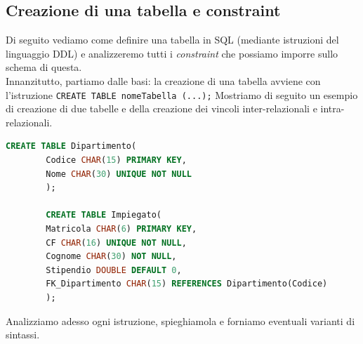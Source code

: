 \documentclass[12pt]{report}
\begin{document}
	\subsection{Creazione di una tabella e constraint}
	Di seguito vediamo come definire una tabella in SQL (mediante istruzioni del linguaggio DDL) e analizzeremo tutti i \textit{constraint} che possiamo imporre sullo schema di questa.\\
	Innanzitutto, partiamo dalle basi: la creazione di una tabella avviene con l'istruzione \texttt{CREATE TABLE nomeTabella (...);}
	Mostriamo di seguito un esempio di creazione di due tabelle e della creazione dei vincoli inter-relazionali e intra-relazionali.
	\begin{lstlisting}[language=SQL]
		CREATE TABLE Dipartimento(
		Codice CHAR(15) PRIMARY KEY,
		Nome CHAR(30) UNIQUE NOT NULL
		);
		
		CREATE TABLE Impiegato(
		Matricola CHAR(6) PRIMARY KEY,
		CF CHAR(16) UNIQUE NOT NULL,
		Cognome CHAR(30) NOT NULL,
		Stipendio DOUBLE DEFAULT 0,
		FK_Dipartimento CHAR(15) REFERENCES Dipartimento(Codice)
		);
	\end{lstlisting}
	Analizziamo adesso ogni istruzione, spieghiamola e forniamo eventuali varianti di sintassi.
\end{document}

